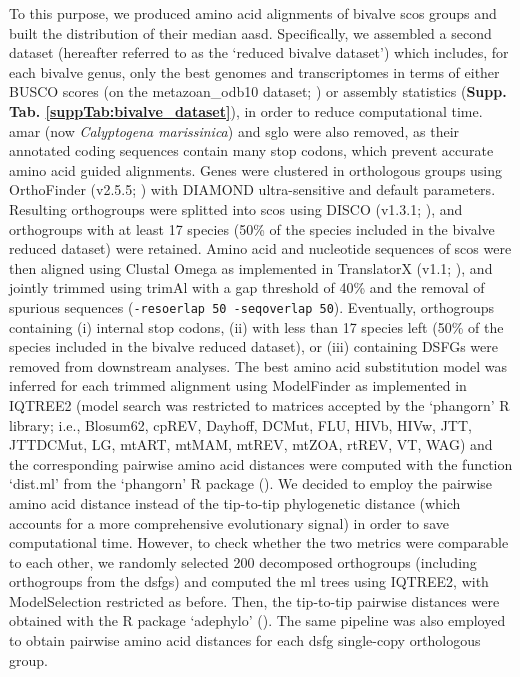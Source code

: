 \documentclass[../main.tex]{subfiles}
\begin{document}
To this purpose, we produced amino acid alignments of bivalve \glspl{sco} groups and built the distribution of their median \gls{aasd}. Specifically, we assembled a second dataset (hereafter referred to as the ‘reduced bivalve dataset’) which includes, for each bivalve genus, only the best genomes and transcriptomes in terms of either BUSCO scores (on the metazoan\_odb10 dataset; \textbf{\cite{manni2021busco}}) or assembly statistics (\textbf{Supp. Tab. \ref{suppTab:bivalve_dataset}}), in order to reduce computational time. \gls{amar} (now \textit{Calyptogena marissinica}) and \gls{sglo} were also removed, as their annotated coding sequences contain many stop codons, which prevent accurate amino acid guided alignments. Genes were clustered in orthologous groups using OrthoFinder (v2.5.5; \textbf{\cite{emms2019orthofinder}}) with DIAMOND ultra-sensitive and default parameters. Resulting orthogroups were splitted into \glspl{sco} using DISCO (v1.3.1; \textbf{\cite{willson2022disco}}), and orthogroups with at least 17 species (50\% of the species included in the bivalve reduced dataset) were retained. Amino acid and nucleotide sequences of \glspl{sco} were then aligned using Clustal Omega as implemented in TranslatorX (v1.1; \textbf{\cite{abascal2010translatorx}}), and jointly trimmed using trimAl with a gap threshold of 40\% and the removal of spurious sequences (\verb|-resoerlap 50 -seqoverlap 50|). Eventually, orthogroups containing (i) internal stop codons, (ii) with less than 17 species left (50\% of the species included in the bivalve reduced dataset), or (iii) containing DSFGs were removed from downstream analyses. The best amino acid substitution model was inferred for each trimmed alignment using ModelFinder as implemented in IQTREE2 (model search was restricted to matrices accepted by the ‘phangorn’ R library; i.e., Blosum62, cpREV, Dayhoff, DCMut, FLU, HIVb, HIVw, JTT, JTTDCMut, LG, mtART, mtMAM, mtREV, mtZOA, rtREV, VT, WAG) and the corresponding pairwise amino acid distances were computed with the function ‘dist.ml’ from the ‘phangorn’ R package (\textbf{\cite{schliep2011phangorn}}). We decided to employ the pairwise amino acid distance instead of the tip-to-tip phylogenetic distance (which accounts for a more comprehensive evolutionary signal) in order to save computational time. However, to check whether the two metrics were comparable to each other, we randomly selected 200 decomposed orthogroups (including orthogroups from the \glspl{dsfg}) and computed the \gls{ml} trees using IQTREE2, with ModelSelection restricted as before. Then, the tip-to-tip pairwise distances were obtained with the R package ‘adephylo’ (\textbf{\cite{jombart2010adephylo}}). The same pipeline was also employed to obtain pairwise amino acid distances for each \gls{dsfg} single-copy orthologous group.
\end{document}
